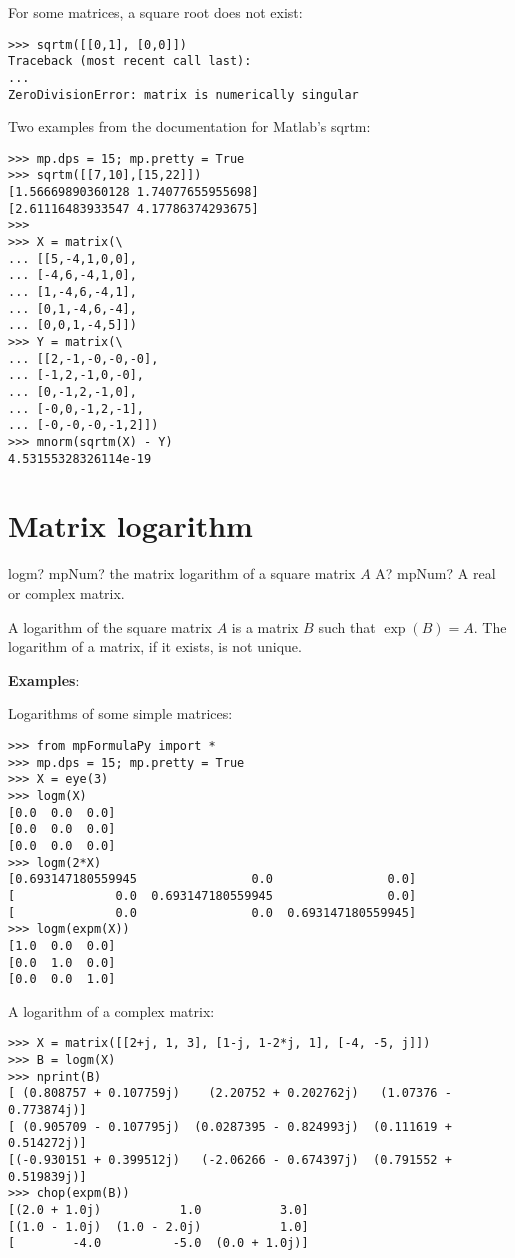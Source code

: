 For some matrices, a square root does not exist:

\begin{lstlisting}
>>> sqrtm([[0,1], [0,0]])
Traceback (most recent call last):
...
ZeroDivisionError: matrix is numerically singular
\end{lstlisting}

Two examples from the documentation for Matlab's sqrtm:

\begin{lstlisting}
>>> mp.dps = 15; mp.pretty = True
>>> sqrtm([[7,10],[15,22]])
[1.56669890360128 1.74077655955698]
[2.61116483933547 4.17786374293675]
>>>
>>> X = matrix(\
... [[5,-4,1,0,0],
... [-4,6,-4,1,0],
... [1,-4,6,-4,1],
... [0,1,-4,6,-4],
... [0,0,1,-4,5]])
>>> Y = matrix(\
... [[2,-1,-0,-0,-0],
... [-1,2,-1,0,-0],
... [0,-1,2,-1,0],
... [-0,0,-1,2,-1],
... [-0,-0,-0,-1,2]])
>>> mnorm(sqrtm(X) - Y)
4.53155328326114e-19
\end{lstlisting}


\newpage
\section{Matrix logarithm}

\begin{mpFunctionsExtract}
	\mpFunctionOne
	{logm? mpNum? the matrix logarithm of a square matrix $A$}
	{A? mpNum? A real or complex matrix.}	
\end{mpFunctionsExtract}


A logarithm of the square matrix $A$ is a matrix $B$ such that $\exp(B)=A$. The logarithm of a matrix, if it exists, is not unique.

\vpara
\textbf{Examples}:

Logarithms of some simple matrices:

\begin{lstlisting}
>>> from mpFormulaPy import *
>>> mp.dps = 15; mp.pretty = True
>>> X = eye(3)
>>> logm(X)
[0.0  0.0  0.0]
[0.0  0.0  0.0]
[0.0  0.0  0.0]
>>> logm(2*X)
[0.693147180559945                0.0                0.0]
[              0.0  0.693147180559945                0.0]
[              0.0                0.0  0.693147180559945]
>>> logm(expm(X))
[1.0  0.0  0.0]
[0.0  1.0  0.0]
[0.0  0.0  1.0]
\end{lstlisting}


A logarithm of a complex matrix:

\begin{lstlisting}
>>> X = matrix([[2+j, 1, 3], [1-j, 1-2*j, 1], [-4, -5, j]])
>>> B = logm(X)
>>> nprint(B)
[ (0.808757 + 0.107759j)    (2.20752 + 0.202762j)   (1.07376 - 0.773874j)]
[ (0.905709 - 0.107795j)  (0.0287395 - 0.824993j)  (0.111619 + 0.514272j)]
[(-0.930151 + 0.399512j)   (-2.06266 - 0.674397j)  (0.791552 + 0.519839j)]
>>> chop(expm(B))
[(2.0 + 1.0j)           1.0           3.0]
[(1.0 - 1.0j)  (1.0 - 2.0j)           1.0]
[        -4.0          -5.0  (0.0 + 1.0j)]
\end{lstlisting}


